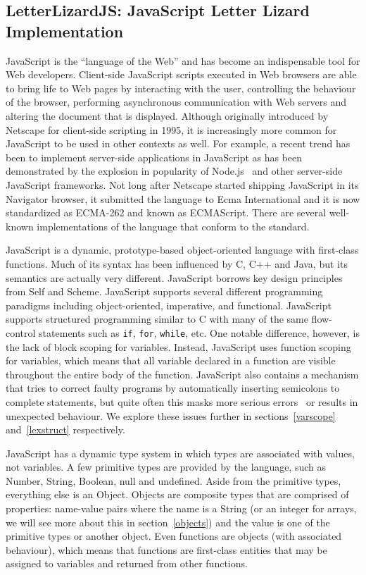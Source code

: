 \FloatBarrier
\subsection{LetterLizardJS: JavaScript Letter Lizard Implementation}
\label{lljs}

JavaScript is the ``language of the Web'' and has become an indispensable 
tool for Web developers. Client-side JavaScript scripts executed in Web
browsers are able to bring life to Web pages by interacting with the user,
controlling the behaviour of the browser, performing asynchronous communication
with Web servers and altering the document that is displayed. Although originally
introduced by Netscape for client-side scripting in 1995, it is increasingly
more common for JavaScript to be used in other contexts as well. For example,
a recent trend has been to implement server-side applications in JavaScript as
has been demonstrated by the explosion in popularity of Node.js~\cite{nodejs} and other
server-side JavaScript frameworks. Not long after Netscape started shipping 
JavaScript in its Navigator browser, it submitted the language to Ecma International
and it is now standardized as ECMA-262 and known as ECMAScript.
There are several well-known implementations of the language that conform to the standard.

JavaScript is a dynamic, prototype-based object-oriented language with first-class
functions. Much of its syntax has been influenced by C, C++ and Java, but
its semantics are actually very different. JavaScript borrows key design principles
from Self and Scheme. JavaScript supports several different programming
paradigms including object-oriented, imperative, and functional. JavaScript supports
structured programming similar to C with many of the same flow-control statements
such as \texttt{if}, \texttt{for}, \texttt{while}, etc. One notable difference,
however, is the lack of block scoping for variables. Instead, JavaScript 
uses function scoping for variables, which means that all variable declared in a
function are visible throughout the entire body of the function. 
JavaScript also contains a mechanism that tries to
correct faulty programs by automatically inserting semicolons to complete statements, but quite
often this masks more serious errors~\cite{goodparts} or results in unexpected behaviour.
We explore these issues further in sections~\ref{varscope} and~\ref{lexstruct} respectively.

JavaScript has a dynamic type system in which types are associated with values,
not variables. A few primitive types are provided by the language, such
as Number, String, Boolean, null and undefined. Aside from the primitive types,
everything else is an Object. Objects are composite types
that are comprised of properties: name-value pairs where the name is a String
(or an integer for arrays, we will see more about this in section~\ref{objects})
and the value is one of the primitive types or another object. Even functions
are objects (with associated behaviour), which means that functions are first-class
entities that may be assigned to variables and returned from other functions.

